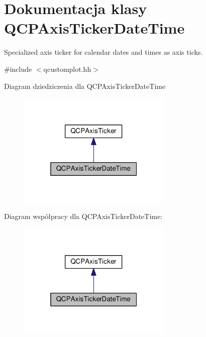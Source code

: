 \hypertarget{class_q_c_p_axis_ticker_date_time}{}\section{Dokumentacja klasy Q\+C\+P\+Axis\+Ticker\+Date\+Time}
\label{class_q_c_p_axis_ticker_date_time}


Specialized axis ticker for calendar dates and times as axis ticks.  




{\ttfamily \#include $<$qcustomplot.\+hh$>$}



Diagram dziedziczenia dla Q\+C\+P\+Axis\+Ticker\+Date\+Time\nopagebreak
\begin{figure}[H]
\begin{center}
\leavevmode
\includegraphics[width=208pt]{class_q_c_p_axis_ticker_date_time__inherit__graph}
\end{center}
\end{figure}


Diagram współpracy dla Q\+C\+P\+Axis\+Ticker\+Date\+Time\+:\nopagebreak
\begin{figure}[H]
\begin{center}
\leavevmode
\includegraphics[width=208pt]{class_q_c_p_axis_ticker_date_time__coll__graph}
\end{center}
\end{figure}
